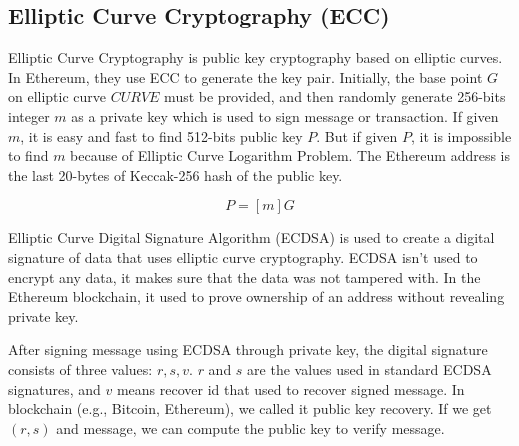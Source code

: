     \subsection{Elliptic Curve Cryptography (ECC)}
        Elliptic Curve Cryptography is public key cryptography based on elliptic curves. In Ethereum, they use ECC to generate the key pair. Initially, the base point \(G\) on elliptic curve \(CURVE\) must be provided, and then randomly generate 256-bits integer \(m\) as a private key which is used to sign message or transaction. If given \(m\), it is easy and fast to find 512-bits public key \(P\). But if given \(P\), it is impossible to find \(m\) because of Elliptic Curve Logarithm Problem. The Ethereum address is the last 20-bytes of  Keccak-256 hash of the public key.\par

        \begin{equation}
            P=[m]G
        \end{equation}

        Elliptic Curve Digital Signature Algorithm (ECDSA) is used to create a digital signature of data that uses elliptic curve cryptography. ECDSA isn't used to encrypt any data, it makes sure that the data was not tampered with. In the Ethereum blockchain, it used to prove ownership of an address without revealing private key. \par
        After signing message using ECDSA through private key, the digital signature consists of three values: \(r, s, v\). \(r\) and \(s\) are the values used in standard ECDSA signatures, and \(v\) means recover id that used to recover signed message. In blockchain (e.g., Bitcoin, Ethereum), we called it public key recovery. If we get \((r, s)\) and message, we can compute the public key to verify message.\par
        
